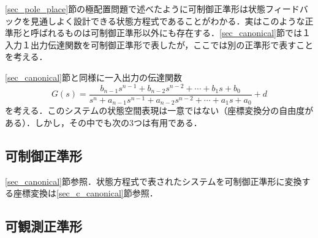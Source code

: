 \ref{sec_pole_place}節の極配置問題で述べたように可制御正準形は状態フィードバックを見通しよく設計できる状態方程式であることがわかる．実はこのような正準形と呼ばれるものは可制御正準形以外にも存在する．\ref{sec_canonical}節では１入力１出力伝達関数を可制御正準形で表したが，ここでは別の正準形で表すことを考える．

\ref{sec_canonical}節と同様に一入出力の伝達関数
\begin{equation}
 G(s) =
  \frac{b_{n-1} s^{n-1} + b_{n-2} s^{n-2} + \cdots + b_1 s + b_0}
  {s^n + a_{n-1} s^{n-1} + a_{n-2} s^{n-2} + \cdots + a_1 s + a_0}
  + d
\end{equation}
を考える．このシステムの状態空間表現は一意ではない（座標変換分の自由度がある）．しかし，その中でも次の3つは有用である．

\subsection{可制御正準形}

\ref{sec_canonical}節参照．状態方程式で表されたシステムを可制御正準形に変換する座標変換は\ref{sec_c_canonical}節参照．

\subsection{可観測正準形}

